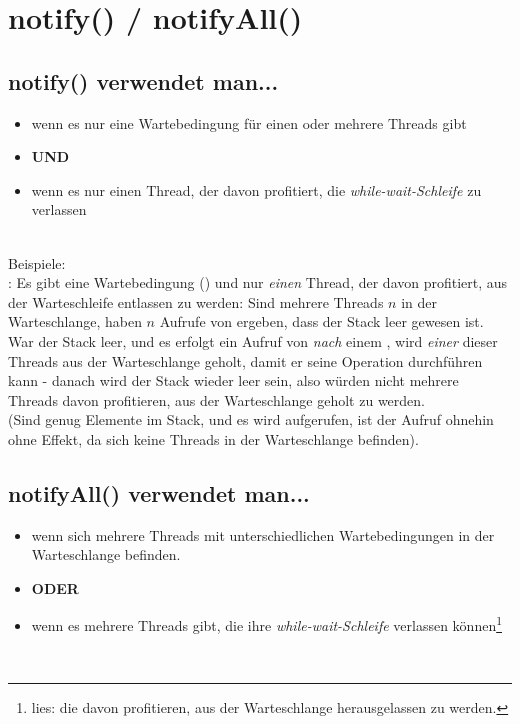 \section{notify() / notifyAll()}

\subsection*{notify() verwendet man...}
\begin{itemize}
    \item wenn es nur eine Wartebedingung für einen oder mehrere Threads gibt
    \item[] \textbf{UND}
    \item wenn es nur einen Thread, der davon profitiert, die \textit{while-wait-Schleife} zu verlassen
\end{itemize}\\

\noindent
Beispiele:\\

\noindent
{}: Es gibt eine Wartebedingung () und nur \textit{einen} Thread, der davon profitiert, aus der Warteschleife entlassen zu werden: Sind mehrere Threads $n$ in der Warteschlange,  haben $n$ Aufrufe von  ergeben, dass der Stack leer gewesen ist.\\
War der Stack leer, und es erfolgt ein Aufruf von  \textit{nach} einem , wird \textit{einer} dieser Threads aus der Warteschlange geholt, damit er seine Operation durchführen kann - danach wird der Stack wieder leer sein, also würden nicht mehrere Threads davon profitieren, aus der Warteschlange geholt zu werden.\\
(Sind genug Elemente im Stack, und es wird  aufgerufen, ist der Aufruf ohnehin ohne Effekt, da sich keine Threads in der Warteschlange befinden).

\subsection*{notifyAll() verwendet man...}
\begin{itemize}
    \item wenn sich mehrere Threads mit unterschiedlichen Wartebedingungen in der Warteschlange befinden.
    \item[] \textbf{ODER}
    \item wenn es mehrere Threads gibt, die ihre \textit{while-wait-Schleife} verlassen können\footnote{
    lies: die davon profitieren, aus der Warteschlange herausgelassen zu werden.
    }
\end{itemize}\\

